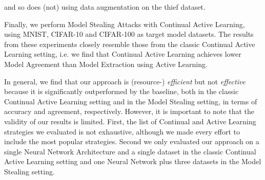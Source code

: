 and so does (not) using data augmentation on the thief dataset. \par
Finally, we perform Model Stealing Attacks with Continual Active Learning, using MNIST, CIFAR-10 and CIFAR-100 as target model datasets. The results from these
experiments closely resemble those from the classic Continual Active Learning setting, i.e. we find that Continual Active Learning achieves lower Model Agreement
than Model Extraction using Active Learning. \par
In general, we find that our approach is (resource-) \textit{efficient} but not \textit{effective} because it is significantly outperformed by the baseline,
both in the classic Continual Active Learning setting and in the Model Stealing setting, in terms of accuracy and agreement, respectively. However, it is important
to note that the validity of our results is limited. First, the list of Continual and Active Learning strategies we evaluated is not exhaustive, although we made
every effort to include the most popular strategies. Second we only evaluated our approach on a single Neural Network Architecture and a single dataset in the 
classic Continual Active Learning setting and one Neural Network plus three datasets in the Model Stealing setting.
